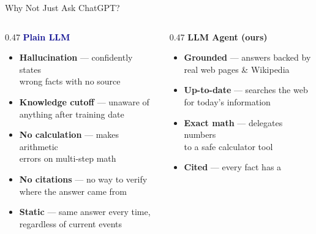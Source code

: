 \documentclass[aspectratio=169]{beamer}
\begin{document}
\begin{frame}{Why Not Just Ask ChatGPT?}
  \begin{columns}[T]
    \begin{column}{0.47\textwidth}
      \textcolor{darkblue}{\textbf{Plain LLM}}\\[0.5em]
      \begin{itemize}
        \setlength\itemsep{0.4em}
        \item[\textcolor{red}{$\times$}] \textbf{Hallucination} — confidently states\\
              wrong facts with no source
        \item[\textcolor{red}{$\times$}] \textbf{Knowledge cutoff} — unaware of\\
              anything after training date
        \item[\textcolor{red}{$\times$}] \textbf{No calculation} — makes arithmetic\\
              errors on multi-step math
        \item[\textcolor{red}{$\times$}] \textbf{No citations} — no way to verify\\
              where the answer came from
        \item[\textcolor{red}{$\times$}] \textbf{Static} — same answer every time,\\
              regardless of current events
      \end{itemize}
    \end{column}
    \hfill
    \begin{column}{0.47\textwidth}
      \textcolor{primary}{\textbf{LLM Agent (ours)}}\\[0.5em]
      \begin{itemize}
        \setlength\itemsep{0.4em}
        \item[\textcolor{primary}{$\checkmark$}] \textbf{Grounded} — answers backed by\\
              real web pages \& Wikipedia
        \item[\textcolor{primary}{$\checkmark$}] \textbf{Up-to-date} — searches the web\\
              for today's information
        \item[\textcolor{primary}{$\checkmark$}] \textbf{Exact math} — delegates numbers\\
              to a safe calculator tool
        \item[\textcolor{primary}{$\checkmark$}] \textbf{Cited} — every fact has a\\

\end{itemize}
\end{column}
\end{columns}
\end{frame}
\end{document}
